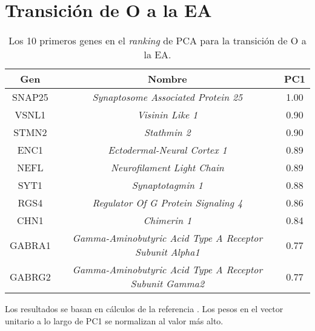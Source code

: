 
\chapter{Transición de O a la EA}\label{apx:apx7}

\begin{table}[!htb]
	\centering
	\caption{Los 10 primeros genes en el \textit{ranking} de PCA para la transición de O a la EA.}
	\label{tab:apx7}
	\begin{tabular}{|c|c|c|}
		\hline
		Gen & Nombre & PC1 \\ \hline
		
		SNAP25 & \textit{Synaptosome Associated Protein 25} & 1.00 \\
		\hline
		VSNL1 & \textit{Visinin Like 1} & 0.90 \\
		\hline
		STMN2 & \textit{Stathmin 2} & 0.90 \\
		\hline
		ENC1 & \textit{Ectodermal-Neural Cortex 1} & 0.89 \\
		\hline
		NEFL & \textit{Neurofilament Light Chain} & 0.89 \\
		\hline
		SYT1 & \textit{Synaptotagmin 1} & 0.88 \\
		\hline
		RGS4 & \textit{Regulator Of G Protein Signaling 4} & 0.86 \\
		\hline
		CHN1 & \textit{Chimerin 1} & 0.84 \\
		\hline
		GABRA1 & \textit{Gamma-Aminobutyric Acid Type A Receptor Subunit Alpha1} & 0.77 \\
		\hline
		GABRG2 & \textit{Gamma-Aminobutyric Acid Type A Receptor Subunit Gamma2} & 0.77 \\
		\hline
		
	\end{tabular}
\end{table}

Los resultados se basan en cálculos de la referencia \cite{Gonzalez_2021}. Los pesos en el vector unitario a lo largo de PC1 se normalizan al valor más alto.
